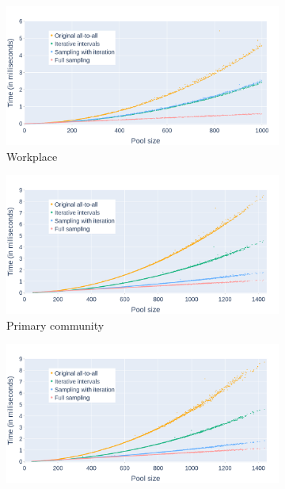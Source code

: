 \begin{figure}
    \centering
    \begin{subfigure}{.8\linewidth}
        \centering
        \includegraphics[width=\textwidth]{4 - Sampling/fig/full_sampling/times_avg_fs_pType_workplace_full.png}
        \caption{Workplace}
        \label{fig:times_avg_fs_pType_workplace_full}
    \end{subfigure}
    \begin{subfigure}{.8\linewidth}
        \centering
        \includegraphics[width=\textwidth]{4 - Sampling/fig/full_sampling/times_avg_fs_pType_primary_full.png}
        \caption{Primary community}
        \label{fig:times_avg_fs_pType_primary_full}
    \end{subfigure}
    \begin{subfigure}{.8\linewidth}
        \centering
        \includegraphics[width=\textwidth]{4 - Sampling/fig/full_sampling/times_avg_fs_pType_secondary_full.png}

\end{subfigure}
\end{figure}
